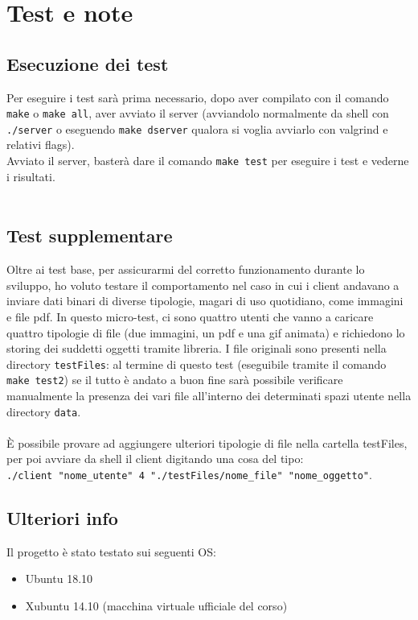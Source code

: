 \section{Test e note}
\begin{flushleft}

\subsection{Esecuzione dei test}
Per eseguire i test sarà prima necessario, dopo aver compilato con il comando \texttt{make} o \texttt{make all}, aver avviato il server (avviandolo normalmente da shell con \texttt{./server} o eseguendo \texttt{make dserver} qualora si voglia avviarlo con valgrind e relativi flags).\\
Avviato il server, basterà dare il comando \texttt{make test} per eseguire i test e vederne i risultati.\\~\\

\subsection{Test supplementare}
Oltre ai test base, per assicurarmi del corretto funzionamento durante lo sviluppo, ho voluto testare il comportamento nel caso in cui i client andavano a inviare dati binari di diverse tipologie, magari di uso quotidiano, come immagini e file pdf. In questo micro-test, ci sono quattro utenti che vanno a caricare quattro tipologie di file (due immagini, un pdf e una gif animata) e richiedono lo storing dei suddetti oggetti tramite libreria. I file originali sono presenti nella directory \texttt{testFiles}: al termine di questo test (eseguibile tramite il comando \texttt{make test2}) se il tutto è andato a buon fine sarà possibile verificare manualmente la presenza dei vari file all'interno dei determinati spazi utente nella directory \texttt{data}.\\~\\
È possibile provare ad aggiungere ulteriori tipologie di file nella cartella testFiles, per poi avviare da shell il client digitando una cosa del tipo:\\ \texttt{./client "nome\_utente" 4 "./testFiles/nome\_file" "nome\_oggetto"}.

\subsection{Ulteriori info}
Il progetto è stato testato sui seguenti OS:
\begin{itemize}
\item Ubuntu 18.10
\item Xubuntu 14.10 (macchina virtuale ufficiale del corso)
\end{itemize}

\end{flushleft}


